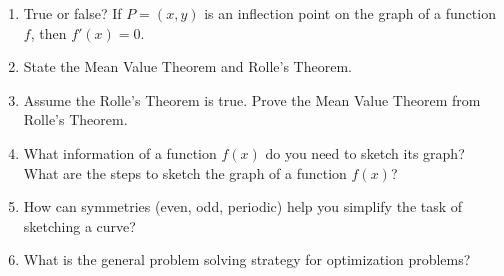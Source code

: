 \documentclass[../main.tex]{subfiles}
\begin{document}
\begin{enumerate}[label=\thesection.\arabic*, align=left]
  \item True or false? If \(P = (x,y)\) is an inflection point on the graph of a function \(f\), then \(f'(x) = 0\).

  \item State the Mean Value Theorem and Rolle's Theorem.

  \item Assume the Rolle's Theorem is true. Prove the Mean Value Theorem from Rolle's Theorem.

  \item What information of a function \(f(x)\) do you need to sketch its graph? What are the steps to sketch the graph of a function \(f(x)\)?

  \item How can symmetries (even, odd, periodic) help you simplify the task of sketching a curve?

  \item What is the general problem solving strategy for optimization problems?
\end{enumerate}
\end{document}
